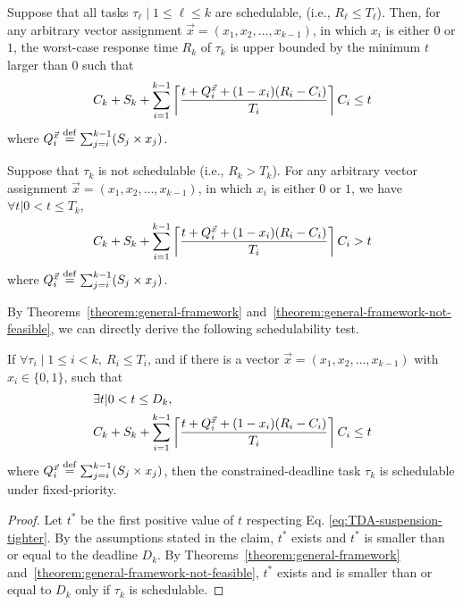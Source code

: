 \begin{theorem}
   \label{theorem:general-framework}
   Suppose that all tasks $\tau_\ell \mid 1 \leq \ell \leq k$ are schedulable, (i.e., $R_\ell \leq T_\ell$). Then, for any arbitrary vector assignment $\vec{x} = (x_1, x_2, \ldots, x_{k-1})$, in which $x_i$ is either $0$ or $1$, the worst-case response time $R_k$ of $\tau_k$ is upper bounded by the minimum $t$ larger than $0$ such that 
   {\small \begin{equation} \label{eq:TDA-suspension-tighter0} 
       C_k + S_k + \sum_{i=1}^{k-1}\ceiling{\frac{t+Q_i^{\vec{x}}+(1-x_i)(R_i-C_i)}{T_i}} C_i \leq t
     \end{equation}}where $Q_i^{\vec{x}} \stackrel{\mathrm{def}}{=} \sum_{j=i}^{k-1} (S_j \times x_j)$.
 \end{theorem} 
\begin{theorem}
   \label{theorem:general-framework-not-feasible}
   Suppose that $\tau_k$ is not schedulable (i.e., $R_k > T_k$). For any arbitrary vector assignment
   $\vec{x} = (x_1, x_2, \ldots, x_{k-1})$, in which $x_i$ is either
   $0$ or $1$,  we have $\forall t | 0 < t \leq T_k$,
   {\small \begin{equation*}
       C_k + S_k + \sum_{i=1}^{k-1}\left\lceil{\frac{t+Q_i^{\vec{x}}+(1-x_i)(R_i-C_i)}{T_i}}\right\rceil C_i > t
     \end{equation*}}where $Q_i^{\vec{x}} \stackrel{\mathrm{def}}{=} \sum_{j=i}^{k-1} (S_j \times x_j)$.
 \end{theorem} 
By Theorems~\ref{theorem:general-framework} and~\ref{theorem:general-framework-not-feasible}, we can directly derive the
following schedulability test.

 \begin{Corollary}
   \label{corollary:general-framework}
   If $\forall \tau_i \mid 1 \leq i < k, ~R_i \leq T_i$, and if there is a vector $\vec{x} = (x_1, x_2, \ldots,
   x_{k-1})$ with $x_i \in \{ 0, 1\}$, such that 
   {\small \begin{align} 
   \label{eq:TDA-suspension-tighter} 
       & \exists t | 0 < t \leq D_k,  \nonumber \\
       & C_k + S_k + \sum_{i=1}^{k-1}\ceiling{\frac{t+Q_i^{\vec{x}}+(1-x_i)(R_i-C_i)}{T_i}} C_i \leq t
     \end{align}}
     where $Q_i^{\vec{x}} \stackrel{\mathrm{def}}{=} \sum_{j=i}^{k-1} (S_j \times x_j)$, then the constrained-deadline task $\tau_k$ is schedulable under fixed-priority.
 \end{Corollary}
 \begin{proof}
Let $t^*$ be the first positive value of $t$ respecting Eq. \eqref{eq:TDA-suspension-tighter}. By the assumptions stated in the claim, $t^*$ exists and $t^*$ is smaller than or equal to the deadline $D_k$. By Theorems~\ref{theorem:general-framework} and~\ref{theorem:general-framework-not-feasible}, $t^*$ exists and is smaller than or equal to $D_k$ only if $\tau_k$ is schedulable.
 \end{proof}

